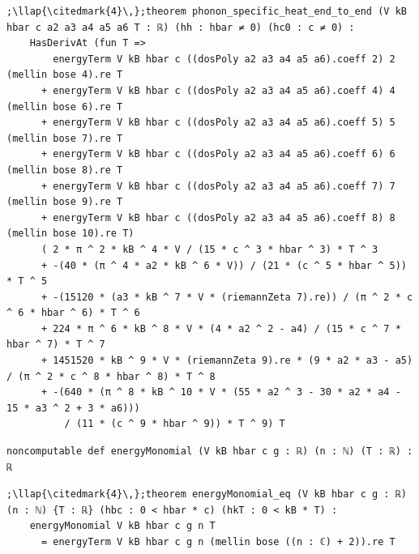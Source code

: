 \begin{lstlisting}[style=leancat]
;\llap{\citedmark{4}\,};theorem phonon_specific_heat_end_to_end (V kB hbar c a2 a3 a4 a5 a6 T : ℝ) (hh : hbar ≠ 0) (hc0 : c ≠ 0) :
    HasDerivAt (fun T =>
        energyTerm V kB hbar c ((dosPoly a2 a3 a4 a5 a6).coeff 2) 2 (mellin bose 4).re T
      + energyTerm V kB hbar c ((dosPoly a2 a3 a4 a5 a6).coeff 4) 4 (mellin bose 6).re T
      + energyTerm V kB hbar c ((dosPoly a2 a3 a4 a5 a6).coeff 5) 5 (mellin bose 7).re T
      + energyTerm V kB hbar c ((dosPoly a2 a3 a4 a5 a6).coeff 6) 6 (mellin bose 8).re T
      + energyTerm V kB hbar c ((dosPoly a2 a3 a4 a5 a6).coeff 7) 7 (mellin bose 9).re T
      + energyTerm V kB hbar c ((dosPoly a2 a3 a4 a5 a6).coeff 8) 8 (mellin bose 10).re T)
      ( 2 * π ^ 2 * kB ^ 4 * V / (15 * c ^ 3 * hbar ^ 3) * T ^ 3
      + -(40 * (π ^ 4 * a2 * kB ^ 6 * V)) / (21 * (c ^ 5 * hbar ^ 5)) * T ^ 5
      + -(15120 * (a3 * kB ^ 7 * V * (riemannZeta 7).re)) / (π ^ 2 * c ^ 6 * hbar ^ 6) * T ^ 6
      + 224 * π ^ 6 * kB ^ 8 * V * (4 * a2 ^ 2 - a4) / (15 * c ^ 7 * hbar ^ 7) * T ^ 7
      + 1451520 * kB ^ 9 * V * (riemannZeta 9).re * (9 * a2 * a3 - a5) / (π ^ 2 * c ^ 8 * hbar ^ 8) * T ^ 8
      + -(640 * (π ^ 8 * kB ^ 10 * V * (55 * a2 ^ 3 - 30 * a2 * a4 - 15 * a3 ^ 2 + 3 * a6)))
          / (11 * (c ^ 9 * hbar ^ 9)) * T ^ 9) T
\end{lstlisting}

\begin{lstlisting}[style=leancat]
noncomputable def energyMonomial (V kB hbar c g : ℝ) (n : ℕ) (T : ℝ) : ℝ
\end{lstlisting}

\begin{lstlisting}[style=leancat]
;\llap{\citedmark{4}\,};theorem energyMonomial_eq (V kB hbar c g : ℝ) (n : ℕ) {T : ℝ} (hbc : 0 < hbar * c) (hkT : 0 < kB * T) :
    energyMonomial V kB hbar c g n T
      = energyTerm V kB hbar c g n (mellin bose ((n : ℂ) + 2)).re T
\end{lstlisting}

